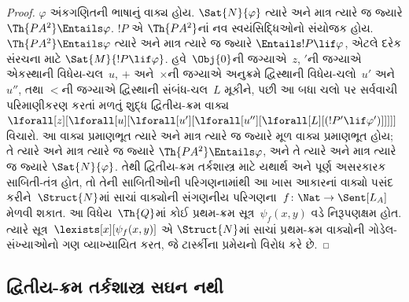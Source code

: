 \begin{proof}
$\varphi$ અંકગણિતની ભાષાનું વાક્ય હોય. $\Sat{N}{\varphi}$ ત્યારે
અને માત્ર ત્યારે જ જ્યારે $\Th{PA^2} \Entails \varphi$. $!P$ એ
$\Th{PA^2}$નાં નવ સ્વયંસિદ્ધિઓનો સંયોજક હોય. $\Th{PA^2} \Entails \varphi$
ત્યારે અને માત્ર ત્યારે જ જ્યારે $\Entails !P \lif
\varphi$, એટલે દરેક સંરચના માટે
$\Sat{M}{!P \lif \varphi}$. 
હવે~$\Obj{0}$ની જગ્યાએ~$z$, $\prime$ની જગ્યાએ એકસ્થાની
વિધેય-ચલ~$u$, $+$ અને~$\times$ની જગ્યાએ અનુક્રમે દ્વિસ્થાની
વિધેય-ચલો~$u'$ અને~$u''$, તથા $<$ની જગ્યાએ દ્વિસ્થાની સંબંધ-ચલ~$L$
મૂકીને, પછી આ બધા ચલો પર સર્વવાચી પરિમાણીકરણ કરતાં મળતું શુદ્ધ
દ્વિતીય-ક્રમ વાક્ય
$\lforall[z][\lforall[u][\lforall[u'][\lforall[u''][\lforall[L][(!P' \lif \varphi')]]]]]$
વિચારો. આ વાક્ય પ્રમાણભૂત ત્યારે અને માત્ર ત્યારે જ જ્યારે મૂળ વાક્ય
પ્રમાણભૂત હોય; તે ત્યારે અને માત્ર ત્યારે જ જ્યારે
$\Th{PA^2} \Entails \varphi$, અને તે ત્યારે અને માત્ર ત્યારે જ જ્યારે
$\Sat{N}{\varphi}$. તેથી દ્વિતીય-ક્રમ તર્કશાસ્ત્ર માટે યથાર્થ અને પૂર્ણ
અસરકારક સાબિતી-તંત્ર હોત, તો તેની સાબિતીઓની પરિગણનામાંથી આ ખાસ
આકારનાં વાક્યો પસંદ કરીને~$\Struct{N}$માં સાચાં વાક્યોની
સંગણનીય પરિગણના~$f\colon \Nat \to \Sent[L_A]$ મેળવી શકાત. આ
વિધેય~$\Th{Q}$માં કોઈ પ્રથમ-ક્રમ સૂત્ર~$\psi_f(x, y)$ વડે નિરૂપણક્ષમ
હોત. ત્યારે સૂત્ર~$\lexists[x][\psi_f(x, y)]$ એ
$\Struct{N}$માં સાચાં પ્રથમ-ક્રમ વાક્યોની ગોડેલ-સંખ્યાઓનો
ગણ વ્યાખ્યાયિત કરત, જે ટાર્સ્કીના પ્રમેયનો વિરોધ કરે છે.
\end{proof}







\subsection{દ્વિતીય-ક્રમ તર્કશાસ્ત્ર સઘન નથી}\label{sol:met:com:sec}

